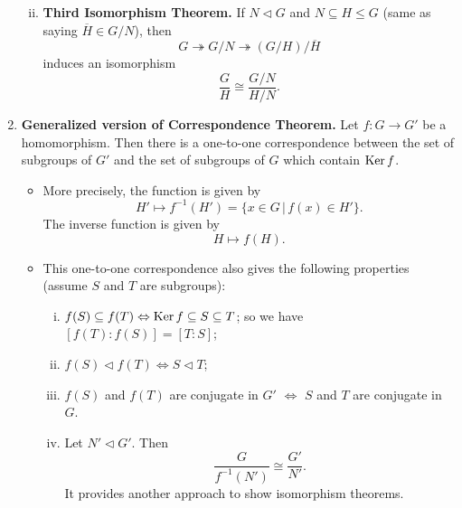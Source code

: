 \begin{enumerate}[(1)]
\begin{enumerate}[(i)]
\begin{equation*}
		\end{equation*}
		\item \textbf{Third Isomorphism Theorem.} If $N\lhd G$ and $N\subseteq H\leq G$ (same as saying $\overline{H}\in G/N$), then $$G\twoheadrightarrow G/N \twoheadrightarrow (G/H)/\overline{H}$$ induces an isomorphism
		\begin{equation*}
			\frac{G}{H} \cong \frac{G/N}{H/N}.
		\end{equation*}
	\end{enumerate}
	\item \textbf{Generalized version of Correspondence Theorem.} Let $f: G\rightarrow G'$ be a homomorphism. Then there is a one-to-one correspondence between the set of subgroups of $G'$ and the set of subgroups of $G$ which contain $\operatorname{Ker} f$.
	\begin{itemize}
		\item More precisely, the function is given by
		\begin{equation*}
			H'\mapsto f^{-1}(H') = \{x\in G\,|\, f(x)\in H'\}.
		\end{equation*}
		The inverse function is given by
		\begin{equation*}
			H\mapsto f(H).
		\end{equation*}
		\item This one-to-one correspondence also gives the following properties (assume $S$ and $T$ are subgroups):
		\begin{enumerate}[(i)]
			\item $f(S)\subseteq f(T)\Leftrightarrow \operatorname{Ker} f \subseteq S\subseteq T$; so we have $[f(T):f(S)] = [T:S]$;
			\item $f(S)\lhd f(T) \Leftrightarrow S\lhd T$;
			\item $f(S)$ and $f(T)$ are conjugate in $G'$ $\Leftrightarrow$ $S$ and $T$ are conjugate in $G$.
			\item Let $N'\lhd G'$. Then
			\begin{equation*}
				\frac{G}{f^{-1}(N')} \cong \frac{G'}{N'}.
			\end{equation*}
			It provides another approach to show isomorphism theorems.
		\end{enumerate}
	\end{itemize}
\end{enumerate}

